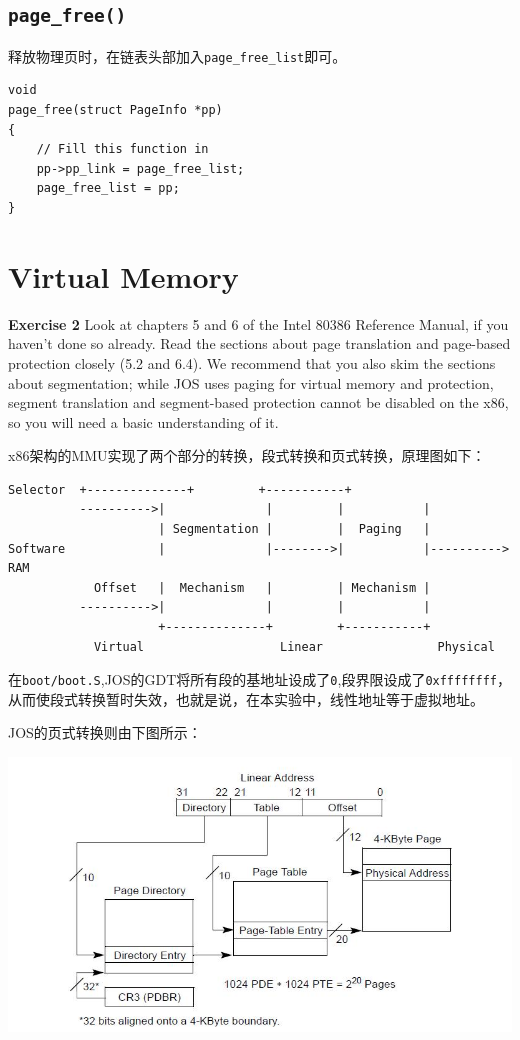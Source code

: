\documentclass[11pt]{article}
\begin{document}
\subsection{\lstinline|page_free()|}
释放物理页时，在链表头部加入\lstinline|page_free_list|即可。
\begin{lstlisting}[title=kern/pmap.c]
void
page_free(struct PageInfo *pp)
{
	// Fill this function in
	pp->pp_link = page_free_list;
	page_free_list = pp;
}
\end{lstlisting}

\section{Virtual Memory}
\begin{framed}
\noindent\textbf{Exercise 2} Look at chapters 5 and 6 of the Intel 80386 Reference Manual, if you haven't done so already. Read the sections about page translation and page-based protection closely (5.2 and 6.4). We recommend that you also skim the sections about segmentation; while JOS uses paging for virtual memory and protection, segment translation and segment-based protection cannot be disabled on the x86, so you will need a basic understanding of it.
\end{framed}
x86架构的MMU实现了两个部分的转换，段式转换和页式转换，原理图如下：
\begin{lstlisting}[frame=none]
           Selector  +--------------+         +-----------+
          ---------->|              |         |           |
                     | Segmentation |         |  Paging   |
Software             |              |-------->|           |---------->  RAM
            Offset   |  Mechanism   |         | Mechanism |
          ---------->|              |         |           |
                     +--------------+         +-----------+
            Virtual                   Linear                Physical
\end{lstlisting}
在\lstinline|boot/boot.S|,JOS的GDT将所有段的基地址设成了\lstinline|0|,段界限设成了\lstinline|0xffffffff|，从而使段式转换暂时失效，也就是说，在本实验中，线性地址等于虚拟地址。

JOS的页式转换则由下图所示：

\includegraphics[scale=0.5]{lab2.pt.jpg}
\end{document}
